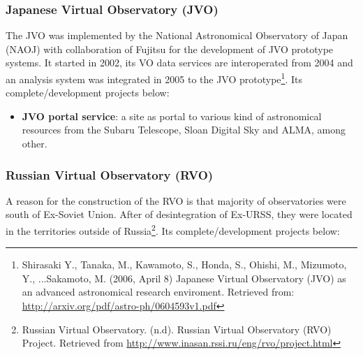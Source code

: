 \subsubsection{Japanese Virtual Observatory (JVO)}
The JVO \cite{website:jvo-home} \nocite{IshiharaMizumotoOhishiKawaray2004} was
implemented by the National Astronomical Observatory of Japan (NAOJ) with
collaboration of Fujitsu for the development of JVO prototype systems. It
started in 2002, its VO data services are interoperated from 2004 and an
analysis system was integrated in 2005 to the JVO prototype\footnote{Shirasaki
Y., Tanaka, M., Kawamoto, S., Honda, S., Ohishi, M., Mizumoto, Y., ...Sakamoto,
M. (2006, April 8) Japanese Virtual Observatory (JVO) as an advanced
astronomical research enviroment. Retrieved from:
\url{http://arxiv.org/pdf/astro-ph/0604593v1.pdf}}. Its complete/development
projects below:

\begin{itemize}
\item \textbf{JVO portal service}:
a site as portal to various kind of astronomical resources from the Subaru
Telescope, Sloan Digital Sky and ALMA, among other.
\end{itemize}

\subsubsection{Russian Virtual Observatory (RVO)}
A reason for the construction of the RVO \cite{website:rvo-home} is that
majority of observatories were south of Ex-Soviet Union. After of desintegration
of Ex-URSS, they were located in the territories outside of
Russia\footnote{Russian Virtual Observatory. (n.d). Russian Virtual Observatory
(RVO) Project. Retrieved from
\url{http://www.inasan.rssi.ru/eng/rvo/project.html}}. Its complete/development
projects below:


